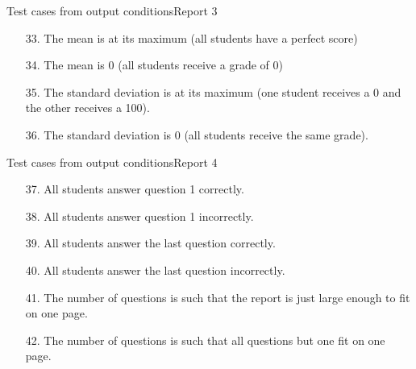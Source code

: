 \begin{Frame}{Test cases from output conditions}{Report 3}
  \begin{itemize}
    \item[33.] The mean is at its maximum (all students have a perfect score)
    \item[34.] The mean is 0 (all students receive a grade of 0)
    \item[35.] The standard deviation is at its maximum (one student receives a 0 and the other receives a 100).
    \item[36.] The standard deviation is 0 (all students receive the same grade).
  \end{itemize}
\end{Frame}

\begin{Frame}{Test cases from output conditions}{Report 4}
  \begin{itemize}
    \item[37.] All students answer question 1 correctly.
    \item[38.] All students answer question 1 incorrectly.
    \item[39.] All students answer the last question correctly.
    \item[40.] All students answer the last question incorrectly.
    \item[41.] The number of questions is such that the report is just large enough to fit on one page.
    \item[42.] The number of questions is such that all questions but one fit on one page.
  \end{itemize}
\end{Frame}